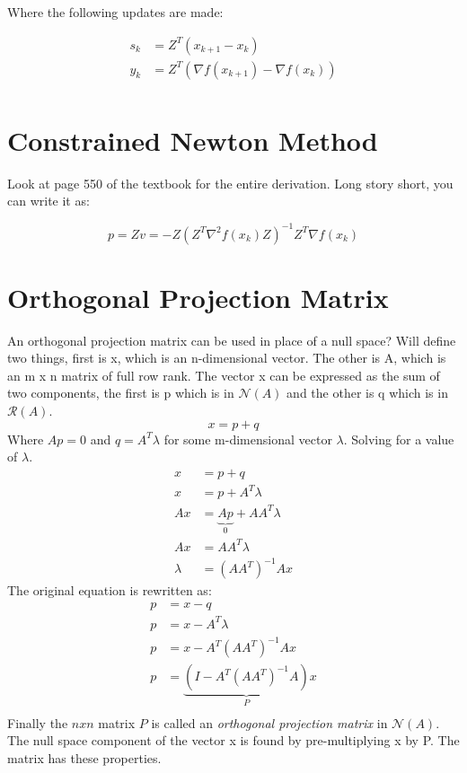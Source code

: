 \documentclass{article}
\begin{document}
Where the following updates are made:

\begin{equation*}
\begin{aligned}
        s_{k} & = Z^{T} (x_{k+1} - x_{k}) \\
        y_{k} & = Z^{T} (\nabla f(x_{k+1}) - \nabla f(x_{k})) \\
\end{aligned}
\end{equation*}

\section{Constrained Newton Method}
Look at page 550 of the textbook for the entire derivation. Long story short, you can write it as:

$$p = Zv = -Z(Z^{T}\nabla^2 f(x_k)Z)^{-1}Z^{T}\nabla f(x_{k})$$

\section{Orthogonal Projection Matrix}

An orthogonal projection matrix can be used in place of a null space? Will define two things, first is x, which is an n-dimensional vector. The other is A, which is an m x n matrix of full row rank. The vector x can be expressed as the sum of two components, the first is p which is in $\mathcal{N}(A)$ and the other is q which is in $\mathcal{R}(A)$.
$$x = p + q$$
Where $Ap = 0$ and $q=A^T \lambda$ for some m-dimensional vector $\lambda$. Solving for a value of $\lambda$.
\begin{equation*}
\begin{aligned}
    x & = p + q \\
    x & = p + A^T\lambda \\
    Ax & = \underbrace{Ap}_{0} + AA^T\lambda \\
    Ax & = AA^T\lambda \\
    \lambda & = (AA^T)^{-1}Ax
\end{aligned}
\end{equation*}
The original equation is rewritten as:
\begin{equation*}
\begin{aligned}
    p & = x - q \\
    p & = x - A^{T} \lambda \\
    p & = x - A^{T}(AA^T)^{-1}Ax \\
    p & = \underbrace{(I - A^{T}(AA^T)^{-1}A)}_{P}x \\
\end{aligned}
\end{equation*}
Finally the $n x n$ matrix $P$ is called an \textit{orthogonal projection matrix} in $\mathcal{N}(A)$. The null space component of the vector x is found by pre-multiplying x by P. The matrix has these properties.
\end{document}
